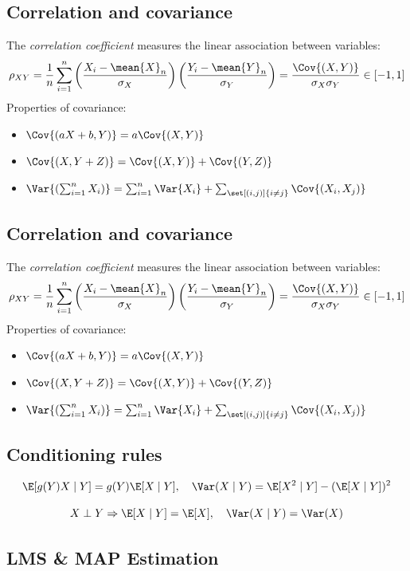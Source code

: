 \documentclass[a4paper]{article}
\begin{document}
            \subsection{Correlation and covariance}
        The \emph{correlation coefficient} measures the linear association between variables:
        \[
            \rho_{XY} = \frac{1}{n} \sum_{i=1}^{n} \left(\frac{X_i - \mean{X}_n}{\sigma_X}\right) \left(\frac{Y_i - \mean{Y}_n}{\sigma_Y}\right) = \frac{\Cov{(X, Y)}}{\sigma_X \sigma_Y} \in [-1, 1]
        \]
        Properties of covariance:
        \begin{itemize}
            \item $\Cov{(aX + b, Y)} = a \Cov{(X, Y)}$
            \item $\Cov{(X, Y + Z)} = \Cov{(X, Y)} + \Cov{(Y, Z)}$
            \item $\Var{\left(\sum_{i=1}^{n} X_i\right)} = \sum_{i=1}^{n} \Var{X_i} + \sum_{\set[(i, j)]{i \neq j}} \Cov{(X_i, X_j)}$
        \end{itemize}
            \subsection{Correlation and covariance}
        The \emph{correlation coefficient} measures the linear association between variables:
        \[
            \rho_{XY} = \frac{1}{n} \sum_{i=1}^{n} \left(\frac{X_i - \mean{X}_n}{\sigma_X}\right) \left(\frac{Y_i - \mean{Y}_n}{\sigma_Y}\right) = \frac{\Cov{(X, Y)}}{\sigma_X \sigma_Y} \in [-1, 1]
        \]
        Properties of covariance:
        \begin{itemize}
            \item $\Cov{(aX + b, Y)} = a \Cov{(X, Y)}$
            \item $\Cov{(X, Y + Z)} = \Cov{(X, Y)} + \Cov{(Y, Z)}$
            \item $\Var{\left(\sum_{i=1}^{n} X_i\right)} = \sum_{i=1}^{n} \Var{X_i} + \sum_{\set[(i, j)]{i \neq j}} \Cov{(X_i, X_j)}$
        \end{itemize}
\subsection{Conditioning rules}

\[
\E[g(Y)X\mid Y]=g(Y)\E[X\mid Y],\quad
\Var(X\mid Y)=\E[X^2\mid Y]-(\E[X\mid Y])^2
\]

\[
X\perp Y \Rightarrow
\E[X\mid Y]=\E[X],\quad
\Var(X\mid Y)=\Var(X)
\]
\subsection{LMS \& MAP Estimation}
\end{document}
